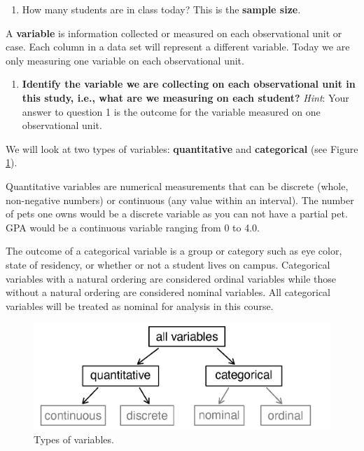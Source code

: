 \documentclass[
]{report}
\providecommand{\tightlist}{%
  \setlength{\itemsep}{0pt}\setlength{\parskip}{0pt}}
\begin{document}
\begin{enumerate}
\def\labelenumi{\arabic{enumi}.}
\setcounter{enumi}{2}
\tightlist
\item
  How many students are in class today? This is the \textbf{sample size}.
\end{enumerate}

\vspace{0.2in}

A \textbf{variable} is information collected or measured on each observational unit or case. Each column in a data set will represent a different variable. Today we are only measuring one variable on each observational unit.

\begin{enumerate}
\def\labelenumi{\arabic{enumi}.}
\setcounter{enumi}{3}
\tightlist
\item
  \textbf{Identify the variable we are collecting on each observational unit in this study, i.e., what are we measuring on each student?} \emph{Hint}: Your answer to question 1 is the outcome for the variable measured on one observational unit.
\end{enumerate}

\vspace{.8in}

We will look at two types of variables: \textbf{quantitative} and \textbf{categorical} (see Figure \ref{fig:types-of-variables}).

Quantitative variables are numerical measurements that can be discrete (whole, non-negative numbers) or continuous (any value within an interval). The number of pets one owns would be a discrete variable as you can not have a partial pet. GPA would be a continuous variable ranging from 0 to 4.0.

The outcome of a categorical variable is a group or category such as eye color, state of residency, or whether or not a student lives on campus. Categorical variables with a natural ordering are considered ordinal variables while those without a natural ordering are considered nominal variables. All categorical variables will be treated as nominal for analysis in this course.

\begin{figure}

{\centering \includegraphics[width=0.5\linewidth]{images/variables} 

}

\caption{Types of variables.}\label{fig:types-of-variables}
\end{figure}
\end{document}
